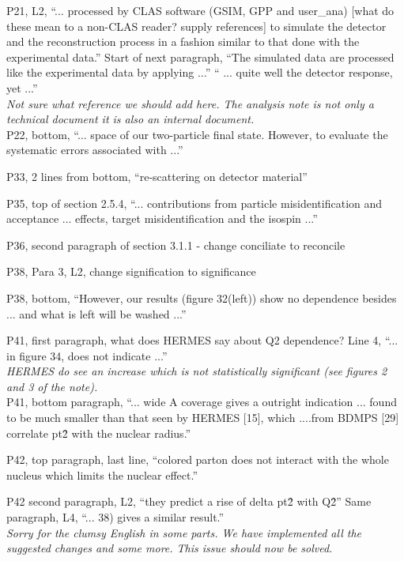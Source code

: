 \documentclass[12pt]{article}
\begin{document}
P21, L2, “... processed by CLAS software (GSIM, GPP and user\_ana) [what do these mean to a 
non-CLAS reader? supply references] to simulate the detector and the reconstruction process in 
a fashion similar to that done with the experimental data.”
Start of next paragraph, “The simulated data are processed like the experimental data by 
applying ...”  “ ... quite well the detector response, yet ...” \\

{\it Not sure what reference we should add here. The analysis note is not only a technical document
it is also an internal document.} \\

P22, bottom, “... space of our two-particle final state.  However, to evaluate the systematic 
errors associated with ...”

P33, 2 lines from bottom, “re-scattering on detector material”

P35, top of section 2.5.4, “... contributions from particle misidentification and acceptance ... 
effects, target misidentification and the isospin ...”

P36, second paragraph of section 3.1.1 -
 change conciliate to reconcile

P38, Para 3, L2, change signification to significance

P38, bottom, “However, our results (figure 32(left)) show no dependence besides ... and what is 
left will be washed ...”

P41, first paragraph, what does HERMES say about Q2 dependence?  Line 4, “... in figure 34, 
does not indicate ...” \\

{\it HERMES do see an increase which is not statistically significant 
(see figures 2 and 3 of the note).} \\

P41, bottom paragraph, “... wide A coverage gives a outright indication ... found to be much 
smaller than that seen by HERMES [15], which ....from BDMPS [29] correlate pt\^2 with the 
nuclear radius.”

P42, top paragraph, last line, “colored parton does not interact with the whole nucleus which 
limits the nuclear effect.”

P42 second paragraph, L2, “they predict a rise of delta pt\^2 with Q\^2”
Same paragraph, L4, “... 38) gives a similar result.” \\

{\it Sorry for the clumsy English in some parts. We have implemented all the 
suggested changes and some more. This issue should now be solved.} \\
\end{document}
